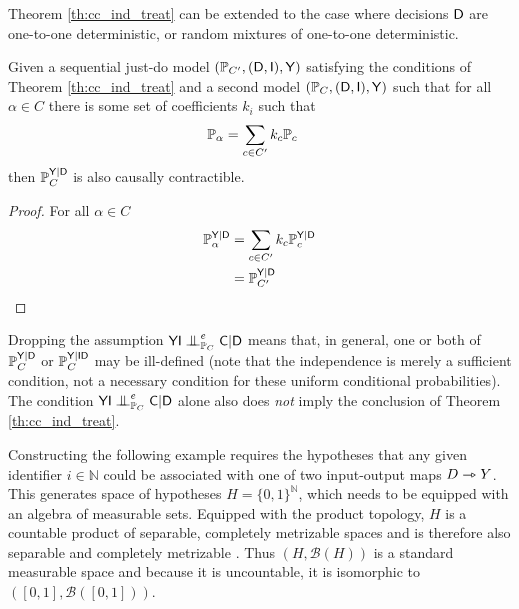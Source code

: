 Theorem \ref{th:cc_ind_treat} can be extended to the case where decisions $\mathsf{D}$ are one-to-one deterministic, or random mixtures of one-to-one deterministic.

\begin{corollary}
Given a sequential just-do model $(\mathbb{P}_{C'},(\mathsf{D},\mathsf{I}),\mathsf{Y})$ satisfying the conditions of Theorem \ref{th:cc_ind_treat} and a second model $(\mathbb{P}_{C},(\mathsf{D},\mathsf{I}),\mathsf{Y})$ such that for all $\alpha\in C$ there is some set of coefficients $k_i$ such that
\begin{align}
    \mathbb{P}_\alpha &= \sum_{c\in C'} k_c \mathbb{P}_c 
\end{align}
then $\mathbb{P}_C^{\mathsf{Y}|\mathsf{D}}$ is also causally contractible.
\end{corollary}

\begin{proof}
For all $\alpha\in C$
\begin{align}
    \mathbb{P}_\alpha^{\mathsf{Y}|\mathsf{D}} &= \sum_{c\in C'} k_c \mathbb{P}_c^{\mathsf{Y}|\mathsf{D}}\\
    &= \mathbb{P}_{C'}^{\mathsf{Y}|\mathsf{D}}
\end{align}
\end{proof}

Dropping the assumption $\RV{YI}\CI^e_{\prob{P}_C} \RV{C}|\RV{D}$ means that, in general, one or both of $\mathbb{P}_C^{\mathsf{Y}|\mathsf{D}}$ or $\mathbb{P}_C^{\mathsf{Y}|\mathsf{ID}}$ may be ill-defined (note that the independence is merely a sufficient condition, not a necessary condition for these uniform conditional probabilities). The condition $\RV{YI}\CI^e_{\prob{P}_C} \RV{C}|\RV{D}$ alone also does \emph{not} imply the conclusion of Theorem \ref{th:cc_ind_treat}. 

Constructing the following example requires the hypotheses that any given identifier $i\in\mathbb{N}$ could be associated with one of two input-output maps $D\rightarrowtriangle Y$. This generates space of hypotheses $H=\{0,1\}^{\mathbb{N}}$, which needs to be equipped with an algebra of measurable sets. Equipped with the product topology, $H$ is a countable product of separable, completely metrizable spaces and is therefore also separable and completely metrizable \citep[Thm. 16.4,Thm. 24.11]{willard_general_1970}. Thus $(H,\mathcal{B}(H))$ is a standard measurable space and because it is uncountable, it is isomorphic to $([0,1],\mathcal{B}([0,1]))$.

